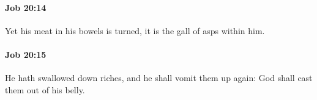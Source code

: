 		\paragraph{Job 20:14} %
			\label{JOB-20-14}

			Yet his meat in his bowels is turned, it is the gall of asps within him.


		\paragraph{Job 20:15} %
			\label{JOB-20-15}

			He hath swallowed down riches, and he shall vomit them up again: God shall cast them out of his belly.


